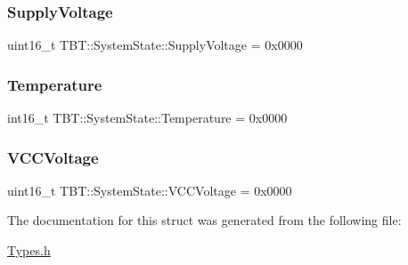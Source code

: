 \subsubsection{\texorpdfstring{Supply\+Voltage}{SupplyVoltage}}
{\footnotesize\ttfamily uint16\+\_\+t T\+B\+T\+::\+System\+State\+::\+Supply\+Voltage = 0x0000}

\mbox{\label{structTBT_1_1SystemState_a88b75704f440bbbf3c854bcb6a7d39dc_a88b75704f440bbbf3c854bcb6a7d39dc}} 
\subsubsection{\texorpdfstring{Temperature}{Temperature}}
{\footnotesize\ttfamily int16\+\_\+t T\+B\+T\+::\+System\+State\+::\+Temperature = 0x0000}

\mbox{\label{structTBT_1_1SystemState_a29bdf61d0e42828467ecc5e1b7e3c650_a29bdf61d0e42828467ecc5e1b7e3c650}} 
\subsubsection{\texorpdfstring{V\+C\+C\+Voltage}{VCCVoltage}}
{\footnotesize\ttfamily uint16\+\_\+t T\+B\+T\+::\+System\+State\+::\+V\+C\+C\+Voltage = 0x0000}



The documentation for this struct was generated from the following file\+:\begin{DoxyCompactItemize}
\item 
\hyperlink{Types_8h}{Types.\+h}\end{DoxyCompactItemize}
